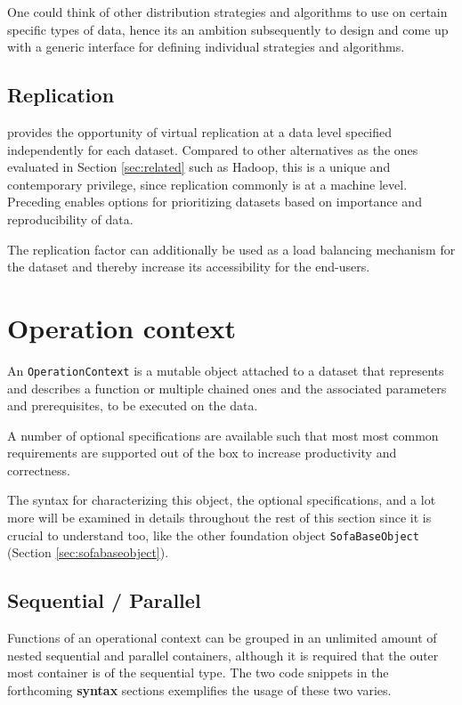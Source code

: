 One could think of other distribution strategies and algorithms to use on certain specific types of data, hence its an ambition subsequently to design and come up with a generic interface for defining individual strategies and algorithms.

\subsection{Replication}
\CodeName provides the opportunity of virtual replication at a data level specified independently for each dataset. Compared to other alternatives as the ones evaluated in Section \ref{sec:related} such as Hadoop, this is a unique and contemporary privilege, since replication commonly is at a machine level. Preceding enables options for prioritizing datasets based on importance and reproducibility of data.
\newline

The replication factor can additionally be used as a load balancing mechanism for the dataset and thereby increase its accessibility for the end-users.

\section{Operation context} \label{sec:operation}
An \texttt{OperationContext} is a mutable object attached to a dataset that represents and describes a function or multiple chained ones and the associated parameters and prerequisites, to be executed on the data. 

A number of optional specifications are available such that most most common requirements are supported out of the box to increase productivity and correctness.
\newline

The syntax for characterizing this object, the optional specifications, and a lot more will be examined in details throughout the rest of this section since it is crucial to understand too, like the other foundation object \texttt{SofaBaseObject} (Section \ref{sec:sofabaseobject}).

\subsection{Sequential / Parallel}
Functions of an operational context can be grouped in an unlimited amount of nested sequential and parallel containers, although it is required that the outer most container is of the sequential type. The two code snippets in the forthcoming \textbf{syntax} sections exemplifies the usage of these two varies.


